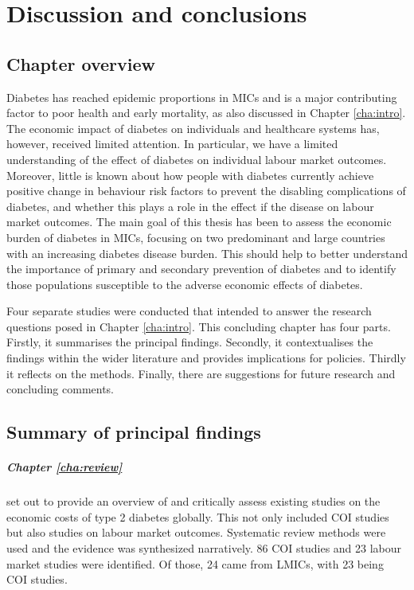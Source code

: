 \chapter{\label{cha:Discussion}Discussion and conclusions} 
\acresetall  %
 \newpage \section{Chapter overview}
Diabetes has reached epidemic proportions in \acp{MIC} and is a major contributing factor to poor health and early mortality, as also discussed in Chapter \ref{cha:intro}. The economic impact of diabetes on individuals and healthcare systems has, however, received limited attention. In particular, we have a limited understanding of the effect of diabetes on individual labour market outcomes. Moreover, little is known about how people with diabetes currently achieve positive change in behaviour risk factors to prevent the disabling complications of diabetes, and whether this plays a role in the effect if the disease on labour market outcomes. The main goal of this thesis has been to assess the economic burden of diabetes in \acp{MIC}, focusing on two predominant and large countries with an increasing diabetes disease burden. This should help to better understand the importance of primary and secondary prevention of diabetes and to identify those populations \DIFdelbegin {}\DIFdelend \DIFaddbegin {}\DIFaddend susceptible to the adverse economic effects of diabetes.

Four separate studies were conducted that intended to answer the research questions posed in Chapter \ref{cha:intro}. This concluding chapter has four parts. Firstly, it summarises the principal findings. Secondly, it contextualises the findings within the wider literature and provides implications for policies. Thirdly it reflects on the methods. Finally, there are suggestions for future research and concluding comments.

\section{Summary of principal findings}



\paragraph{Chapter \ref{cha:review}} set out to provide an overview of and critically assess existing studies on the economic costs of type 2 diabetes globally. This not only included \ac{COI} studies but also studies on labour market outcomes. Systematic review methods were used and the evidence was synthesized narratively. 86 \ac{COI} studies and 23 labour market studies were identified. Of those, 24 came from \acp{LMIC}, with 23 being \ac{COI} studies.

